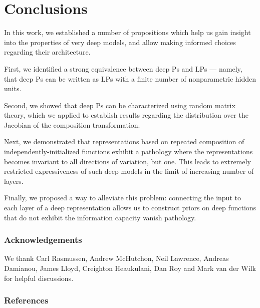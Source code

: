 \documentclass[twoside]{article}
\makeatletter
\newlength{\nonHumbleHeight}
\def\@humbleformat#1{{\settoheight{\nonHumbleHeight}{#1}\resizebox{!}{0.94\nonHumbleHeight}{#1}}}%
\def\humble#1{\@humbleformat{#1}}%
\newcommand{\gp}{{\humble GP}}
\newcommand{\MLP}{{\humble MLP}}
\newcommand{\sectiondist}{}
\makeatother
\begin{document}





\section{Conclusions}
\sectiondist

In this work, we established a number of propositions which help us gain insight into the properties of very deep models, and allow making informed choices regarding their architecture.

First, we identified a strong equivalence between deep \gp{}s and \MLP{}s --- namely, that deep \gp{}s can be written as \MLP{}s with a finite number of nonparametric hidden units. 

Second, we showed that deep \gp{}s can be characterized using random matrix theory, which we applied to establish results regarding the distribution over the Jacobian of the composition transformation.

Next, we demonstrated that representations based on repeated composition of independently-initialized functions exhibit a pathology where the representations becomes invariant to all directions of variation, but one. This leads to extremely restricted expressiveness of such deep models in the limit of increasing number of layers. 

Finally, we proposed a way to alleviate this problem: connecting the input to each layer of a deep representation allows us to construct priors on deep functions that do not exhibit the information capacity vanish pathology.


\subsubsection*{Acknowledgements}
We thank Carl Rasmussen, Andrew McHutchon, Neil Lawrence, Andreas Damianou, James Lloyd, Creighton Heaukulani, Dan Roy and Mark van der Wilk for helpful discussions.

\subsubsection*{References}
\vspace{-0.3in}
\renewcommand{\refname}{}



\end{document}
